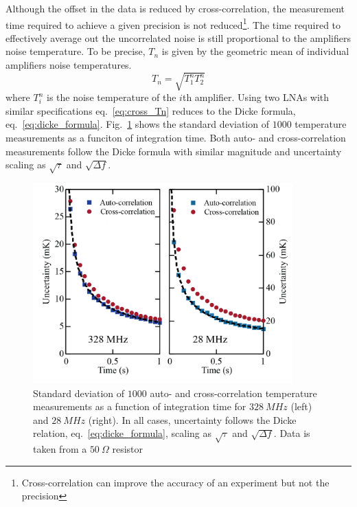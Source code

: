 Although the offset in the data is reduced by cross-correlation, the measurement time required to achieve a given precision is not reduced\footnote{Cross-correlation can improve the accuracy of an experiment but not the precision}. The time required to effectively average out the uncorrelated noise is still proportional to the amplifiers noise temperature. To be precise, $T_n$ is given by the geometric mean of individual amplifiers noise temperatures.
\begin{equation}\label{eq:cross_Tn}
T_n = \sqrt{T_1^nT_2^n}
\end{equation}
where $T_i^n$ is the noise temperature of the $i$th amplifier. Using two LNAs with similar specifications eq.~\ref{eq:cross_Tn} reduces to the Dicke formula, eq.~\ref{eq:dicke_formula}. Fig.~\ref{fig:cross_sensitivity} shows the standard deviation of $1000$ temperature measurements as a funciton of integration time. Both auto- and cross-correlation measurements follow the Dicke formula with similar magnitude and uncertainty scaling as $\sqrt{\tau}$ and $\sqrt{\Delta f}$.
\begin{figure}
\centering
\includegraphics[width = 100mm]{figures/Johnson_noise_thermometry/cross_sensitivity.png}
\caption{Standard deviation of $1000$ auto- and cross-correlation temperature measurements as a function of integration time for $328~MHz$ (left) and $28~MHz$ (right). In all cases, uncertainty follows the Dicke relation, eq.~\ref{eq:dicke_formula}, scaling as $\sqrt{\tau}$ and $\sqrt{\Delta f}$. Data is taken from a $50~\Omega$ resistor}
\label{fig:cross_sensitivity}
\end{figure}
 


